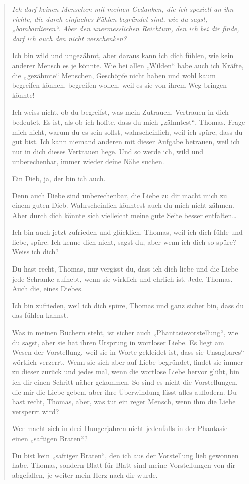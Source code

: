 \documentclass[10pt,a5paper]{book}
\newenvironment{tg}{\begin{quote}\em}{\end{quote}}
\begin{document}
\begin{tg}
Ich darf keinen Menschen mit meinen Gedanken, die ich speziell an ihn richte, die durch einfaches Fühlen begründet sind, wie du sagst, „bombardieren“. Aber den unermesslichen  Reichtum, den ich bei dir finde, darf ich auch den nicht verschenken?

Ich bin wild und ungezähmt, aber daraus kann ich dich fühlen, wie kein anderer Mensch es je könnte. Wie bei allen „Wilden“ habe auch ich Kräfte, die „gezähmte“ Menschen, Geschöpfe nicht haben und wohl kaum begreifen können, begreifen wollen, weil es sie von ihrem Weg bringen könnte!

Ich weiss nicht, ob du begreifst, was mein Zutrauen, Vertrauen in dich bedeutet. Es ist, als ob ich hoffte, dass du mich „zähmtest“, Thomas. Frage mich nicht, warum du es sein sollst, wahrscheinlich, weil ich spüre, dass du gut bist. Ich kann niemand anderen mit dieser Aufgabe betrauen, weil ich nur in dich dieses Vertrauen hege. Und so werde ich, wild und unberechenbar, immer wieder deine Nähe suchen.

Ein Dieb, ja, der bin ich auch.

Denn auch Diebe sind unberechenbar, die Liebe zu dir macht mich zu einem guten Dieb. Wahrscheinlich könntest auch du mich nicht zähmen. Aber durch dich könnte sich vielleicht meine gute Seite besser entfalten\dots 

Ich bin auch jetzt zufrieden und glücklich, Thomas, weil ich dich fühle und liebe, spüre. Ich kenne dich nicht, sagst du, aber wenn ich dich so spüre? Weiss ich dich?

Du hast recht, Thomas, nur vergisst du, dass ich dich liebe und die Liebe jede Schranke aufhebt, wenn sie wirklich und ehrlich ist. Jede, Thomas. Auch die, eines Diebes.

Ich bin zufrieden, weil ich dich spüre, Thomas und ganz sicher bin, dass du das fühlen kannst.

Was in meinen Büchern steht, ist sicher auch „Phantasievorstellung“, wie du sagst, aber sie hat ihren Ursprung in wortloser Liebe. Es liegt am Wesen der Vorstellung, weil sie in Worte gekleidet ist, dass sie Unsagbares“ wörtlich verzerrt. Wenn sie sich aber auf Liebe begründet, findet sie immer zu dieser zurück und jedes mal, wenn die wortlose Liebe hervor glüht, bin ich dir einen Schritt näher gekommen. So sind es nicht die Vorstellungen, die mir die Liebe geben, aber ihre Überwindung lässt alles auflodern. Du hast recht, Thomas, aber, was tut ein reger Mensch, wenn ihm die Liebe versperrt wird?

Wer macht sich in drei Hungerjahren nicht jedenfalls in der Phantasie einen „saftigen Braten“?

Du bist kein „saftiger Braten“, den ich aus der Vorstellung lieb gewonnen habe, Thomas, sondern Blatt für Blatt sind meine Vorstellungen von dir abgefallen, je weiter mein Herz nach dir wurde.
\end{tg}
\end{document}
